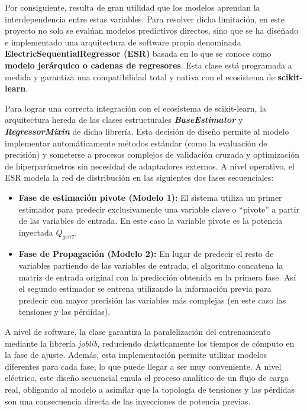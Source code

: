 Por consiguiente, resulta de gran utilidad que los modelos aprendan la interdependencia entre estas variables. Para resolver dicha limitación, en este proyecto no solo se evalúan modelos predictivos directos, sino que se ha diseñado e implementado una arquitectura de software propia denominada \textbf{ElectricSequentialRegressor (ESR)} basada en lo que se conoce como \textbf{modelo jerárquico o cadenas de regresores}. Esta clase está programada a medida y garantiza una compatibilidad total y nativa con el ecosistema de \textbf{scikit-learn}. 

Para lograr una correcta integración con el ecosistema de scikit-learn, la arquitectura hereda de las clases estructurales \textbf{\textit{BaseEstimator}} y \textbf{\textit{RegressorMixin}} de dicha librería. Esta decisión de diseño permite al modelo implementar automáticamente métodos estándar (como la evaluación de precisión) y someterse a procesos complejos de validación cruzada y optimización de hiperparámetros sin necesidad de adaptadores externos. A nivel operativo, el ESR modela la red de distribución en las siguientes dos fases secuenciales:
\begin{itemize}
	\item \textbf{Fase de estimación pivote (Modelo 1):} El sistema utiliza un primer estimador para predecir exclusivamente una variable clave o ``pivote'' a partir de las variables de entrada. En este caso la variable pivote es la potencia inyectada $Q_{gen7}$.
	\item \textbf{Fase de Propagación (Modelo 2):} En lugar de predecir el resto de variables partiendo de las variables de entrada, el algoritmo concatena la matriz de entrada original con la predicción obtenida en la primera fase. Así el segundo estimador se entrena utilizando la información previa para predecir con mayor precisión las variables más complejas (en este caso las tensiones y las pérdidas).
\end{itemize}

A nivel de software, la clase garantiza la paralelización del entrenamiento mediante la librería \textit{joblib}, reduciendo drásticamente los tiempos de cómputo en la fase de ajuste. Además, esta implementación permite utilizar modelos diferentes para cada fase, lo que puede llegar a ser muy conveniente. A nivel eléctrico, este diseño secuencial emula el proceso analítico de un flujo de carga real, obligando al modelo a asimilar que la topología de tensiones y las pérdidas son una consecuencia directa de las inyecciones de potencia previas.
\clearpage

